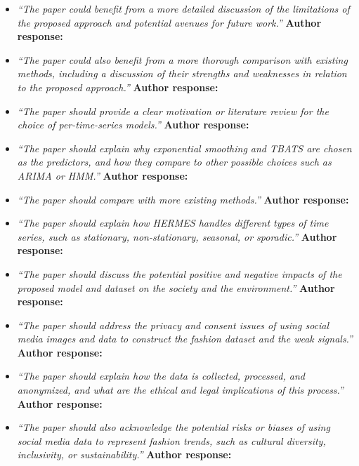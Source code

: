 \documentclass[10pt]{article} %
\begin{document}
\begin{itemize}
	
	\item {\em ``The paper could benefit from a more detailed discussion of the limitations of the proposed approach and potential avenues for future work.''} \medskip
	\textbf{Author response:} \\
	
	\item {\em ``The paper could also benefit from a more thorough comparison with existing methods, including a discussion of their strengths and weaknesses in relation to the proposed approach.''} \medskip
	\textbf{Author response:} \\
	
	\item {\em ``The paper should provide a clear motivation or literature review for the choice of per-time-series models.''} \medskip
	\textbf{Author response:} \\
	
	\item {\em ``The paper should explain why exponential smoothing and TBATS are chosen as the predictors, and how they compare to other possible choices such as ARIMA or HMM.''} \medskip
	\textbf{Author response:} \\
	
	\item {\em ``The paper should compare with more existing methods.''} \medskip
	\textbf{Author response:} \\
	
	\item {\em ``The paper should explain how HERMES handles different types of time series, such as stationary, non-stationary, seasonal, or sporadic.''} \medskip
	\textbf{Author response:} \\
	
	\item {\em ``The paper should discuss the potential positive and negative impacts of the proposed model and dataset on the society and the environment.''} \medskip
	\textbf{Author response:} \\
	
	\item {\em ``The paper should address the privacy and consent issues of using social media images and data to construct the fashion dataset and the weak signals.''} \medskip
	\textbf{Author response:} \\
	
	\item {\em ``The paper should explain how the data is collected, processed, and anonymized, and what are the ethical and legal implications of this process.''} \medskip
	\textbf{Author response:} \\
	
	\item {\em ``The paper should also acknowledge the potential risks or biases of using social media data to represent fashion trends, such as cultural diversity, inclusivity, or sustainability.''} \medskip
	\textbf{Author response:} \\	
\end{itemize}
\end{document}
